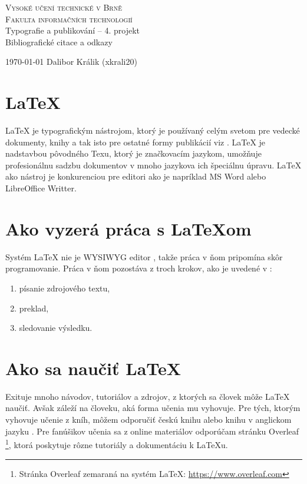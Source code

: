 \documentclass[a4paper, 11pt]{article}
\begin{document}
\thispagestyle{empty}

\begin{titlepage}
\begin{center}
    
    {\Huge
    \textsc{
    Vysoké učení technické v Brně\\[0.4em]}
    {\huge
    \textsc{
    Fakulta informačních technologií}}}\\
    {\LARGE
    Typografie a publikování -- 4. projekt\\[0.3em]
    {\Huge Bibliografické citace a odkazy}
    }
\end{center}

{\Large \today \hfill
Dalibor Králik (xkrali20)}

\end{titlepage}

\section{\LaTeX}
\LaTeX\:  je typografickým nástrojom, ktorý je používaný celým svetom pre vedecké dokumenty, knihy a tak isto pre ostatné formy publikácií viz  \cite{WhyLearnLatex}. 
 \LaTeX\:  je nadstavbou pôvodného Texu, ktorý je značkovacím jazykom, umožňuje profesionálnu sadzbu dokumentov v mnoho jazykova  ich špeciálnu úpravu. \LaTeX\: ako nástroj je konkurenciou pre editori ako je napríklad MS Word alebo LibreOffice Writter. \cite{SokolMiroslav2012OLe}

\section{Ako vyzerá práca s \LaTeX om}
Systém \LaTeX\: nie je WYSIWYG editor \cite{WYSIWYG}, takže práca v ňom pripomína skôr programovanie. Práca v ňom pozostáva z troch krokov, ako je uvedené v \cite{Rybicka2003}:
    \begin{enumerate}
        \item písanie zdrojového textu,
        \item preklad,
        \item sledovanie výsledku.
    \end{enumerate}

\section{Ako sa naučiť \LaTeX}
Exituje mnoho návodov, tutoriálov a zdrojov, z ktorých sa človek môže \LaTeX \: naučiť. Avšak záleží na človeku, aká forma učenia mu vyhovuje. Pre tých, ktorým vyhovuje učenie z kníh, môžem odporučiť českú knihu  \cite{Rybicka2003} alebo knihu v anglickom jazyku  \cite{KopkaHelmut2004GtL}. Pre fanúšikov učenia sa z online materiálov odporúčam stránku Overleaf \footnote{Stránka Overleaf zemaraná na systém LaTeX: \href{https://www.overleaf.com}{https://www.overleaf.com}}, ktorá poskytuje rôzne tutoriály a dokumentáciu k \LaTeX u.
\end{document}
